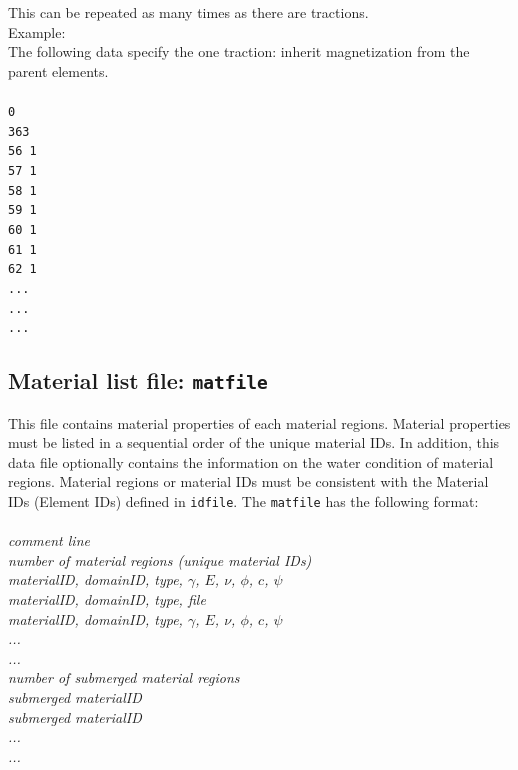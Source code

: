 This can be repeated as many times as there are tractions.\\

Example:\\
The following data specify the one traction: inherit magnetization from the parent elements.\\\\

\texttt{0\\
363\\
56 1\\
57 1\\
58 1\\
59 1\\
60 1\\
61 1\\
62 1\\
...\\
...\\
...}\\

\subsection{Material list file: \texttt{matfile}}

This file contains material properties of each material regions. Material properties must be listed in a sequential order of the unique material IDs. In addition, this data file optionally contains the information on the water condition of material regions. Material regions or material IDs must be consistent with the Material IDs (Element IDs) defined in \texttt{idfile}. The \texttt{matfile} has the following format:\\\\

\emph{comment line}\\
\emph{number of material regions (unique material IDs)\\
materialID, domainID, type, $\gamma$, $E$, $\nu$, $\phi$, $c$, $\psi$ \\
materialID, domainID, type, file \\
materialID, domainID, type, $\gamma$, $E$, $\nu$, $\phi$, $c$, $\psi$ \\
...\\
...\\
number of submerged material regions\\
submerged materialID\\
submerged materialID\\
...\\
...\\}

